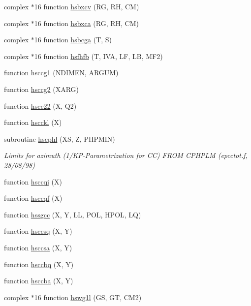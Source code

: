 \begin{DoxyCompactItemize}
\item 
complex $\ast$16 function \hyperlink{djangoh__h_8f_a8b69a1c6406582be624108c3aeda9778}{hsbxcv} (RG, RH, CM)
\item 
complex $\ast$16 function \hyperlink{djangoh__h_8f_a22ad387aac25047b40cfa42010b03f18}{hsbxca} (RG, RH, CM)
\item 
complex $\ast$16 function \hyperlink{djangoh__h_8f_a781ec07a20463ca988388d2121eb94d5}{hsbcga} (T, S)
\item 
complex $\ast$16 function \hyperlink{djangoh__h_8f_a5d39508d58f522981aa44d59b8d1d957}{hsfhfb} (T, I\+VA, LF, LB, M\+F2)
\item 
function \hyperlink{djangoh__h_8f_aaaf0f64c1121c876322e2ffb671892ca}{hsccg1} (N\+D\+I\+M\+EN, A\+R\+G\+UM)
\item 
function \hyperlink{djangoh__h_8f_ad782a8300eee4dbbf48f601d5edf7b51}{hsccg2} (X\+A\+RG)
\item 
function \hyperlink{djangoh__h_8f_a9316859837231a7b987eafbd324d75eb}{hscc22} (X, Q2)
\item 
function \hyperlink{djangoh__h_8f_aed992d5dc5fb25be3013764283c558c7}{hscckl} (X)
\item 
subroutine \hyperlink{djangoh__h_8f_ac0cdf5845e2bc8c727f04dc6887522ac}{hscphl} (XS, Z, P\+H\+P\+M\+IN)
\begin{DoxyCompactList}\small\item\em Limits for azimuth (1/\+K\+P-\/\+Parametrization for CC) F\+R\+OM C\+P\+H\+P\+LM (epcctot.\+f, 28/08/98) \end{DoxyCompactList}\item 
function \hyperlink{djangoh__h_8f_a7f1bc2a8736ba4d6676ee875f2e8e7e9}{hsccqi} (X)
\item 
function \hyperlink{djangoh__h_8f_a32a2e6eec39c323750ec10615a705826}{hsccqf} (X)
\item 
function \hyperlink{djangoh__h_8f_ab69b3a52583e8911c01842f23c7c0657}{hssgcc} (X, Y, LL, P\+OL, H\+P\+OL, LQ)
\item 
function \hyperlink{djangoh__h_8f_af7cd27b63b8c68073aeb69bba07489f6}{hsccsq} (X, Y)
\item 
function \hyperlink{djangoh__h_8f_a538a166b17d02e3d254e563bc9938666}{hsccsa} (X, Y)
\item 
function \hyperlink{djangoh__h_8f_a9af05d67c2a86759ce42c81dbf6dbf63}{hsccbq} (X, Y)
\item 
function \hyperlink{djangoh__h_8f_aa99d913eafcd30df292bf796dbc1fc88}{hsccba} (X, Y)
\item 
complex $\ast$16 function \hyperlink{djangoh__h_8f_abb2458bce9a3b0d42c668e047d2f22ed}{hswg1l} (GS, GT, C\+M2)

\end{DoxyCompactItemize}
